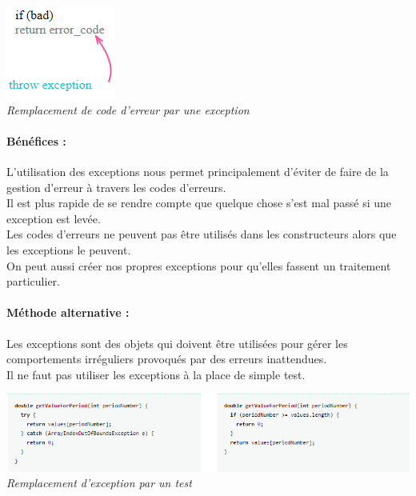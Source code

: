 \documentclass[a4paper,twoside,12pt,openright]{report}
\begin{document}
\begin{center}
\includegraphics[scale=1]{Image/ThrowException.png}\\
\itshape{Remplacement de code d'erreur par une exception \cite{ref8}}
\end{center}

\paragraph{Bénéfices :}
L'utilisation des exceptions nous permet principalement d'éviter de faire de la gestion d'erreur à travers les codes d'erreurs.\\
Il est plus rapide de se rendre compte que quelque chose s'est mal passé si une exception est levée.\\
Les codes d'erreurs ne peuvent pas être utilisés dans les constructeurs alors que les exceptions le peuvent.\\
On peut aussi créer nos propres exceptions pour qu'elles fassent un traitement particulier.\\

\paragraph{Méthode alternative :}
Les exceptions sont des objets qui doivent être utilisées pour gérer les comportements irréguliers provoqués par des erreurs inattendues.\\
Il ne faut pas utiliser les exceptions à la place de simple test.\\

\begin{center}
\includegraphics[scale=0.75]{Image/ExceptionTest.png}\\
\itshape{Remplacement d'exception par un test \cite{ref5}}
\end{center}
\end{document}
